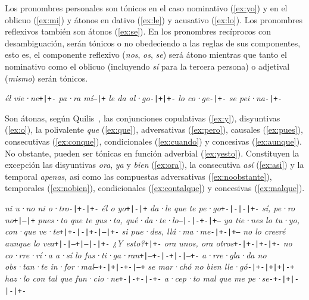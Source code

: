 Los pronombres personales son tónicos en el caso nominativo (\ref{ex:yo}) y en el oblicuo (\ref{ex:mi}) y átonos en dativo (\ref{ex:le}) y acusativo (\ref{ex:lo}). Los pronombres reflexivos también son átonos  (\ref{ex:se}). En los pronombres recíprocos con desambiguación, serán tónicos o no obedeciendo a las reglas de sus componentes, esto es, el componente reflexivo (\textit{nos}, \textit{os}, \textit{se}) será átono mientras que tanto el nominativo como el oblicuo (incluyendo \textit{sí} para la tercera persona) o adjetival (\textit{mismo}) serán tónicos.
\begin{exe}
	\ex\label{ex:yo}\textit{él vie·ne}\tab\texttt{+|+-}
	\ex\label{ex:mi}\textit{pa·ra mí}\tab\texttt{--|+}
	\ex\label{ex:le}\textit{le da al·go}\tab\texttt{-|+|+-}
	\ex\label{ex:lo}\textit{lo co·ge}\tab\texttt{-|+-}
	\ex\label{ex:se}\textit{se pei·na}\tab\texttt{-|+-}
\end{exe}

Son átonas, según Quilis~\parencite*[24]{quilis2013}, las conjunciones copulativas (\ref{ex:y}), disyuntivas (\ref{ex:o}), la polivalente \textit{que} (\ref{ex:que}), adversativas (\ref{ex:pero}), causales (\ref{ex:pues}), consecutivas (\ref{ex:conque}), condicionales (\ref{ex:cuando}) y concesivas (\ref{ex:aunque}). No obstante, pueden ser tónicas en función adverbial (\ref{ex:yesto}). Constituyen la excepción las disyuntivas \textit{ora}, \textit{ya} y \textit{bien} (\ref{ex:ora}), la consecutiva \textit{así} (\ref{ex:asi}) y la temporal \textit{apenas}, así como las compuestas adversativas (\ref{ex:noobstante}), temporales (\ref{ex:nobien}), condicionales (\ref{ex:contalque}) y concesivas  (\ref{ex:malque}).
\begin{exe}
	\ex\label{ex:y}\textit{ni u·no ni o·tro}\tab \texttt{-|+-|+-}
	\ex\label{ex:o}\textit{él o yo}\tab \texttt{+|-|+}
	\ex\label{ex:que}\textit{da·le que te pe·go}\tab \texttt{+-|-|-|+-}
	\ex\label{ex:pero}\textit{sí, pe·ro no}\tab \texttt{+|--|+}
	\ex\label{ex:pues}\textit{pues·to que te gus·ta, qué·da·te·lo}\tab \texttt{--|-|-+-|+---}
	\ex\label{ex:conque}\textit{ya tie·nes lo tu·yo, con·que ve·te}\tab \texttt{+|+-|-|+-|--|+-}
	\ex\label{ex:cuando}\textit{si pue·des, llá·ma·me}\tab \texttt{-|+-|+--}
	\ex\label{ex:aunque}\textit{no lo creeré aunque lo vea}\tab\texttt{+|-|--+|--|-|+-}
	\ex\label{ex:yesto}\textit{¿Y esto?}\tab \texttt{+|+-}
	\ex\label{ex:ora}\textit{ora unos, ora otros}\tab \texttt{+-|+-|+-|+-}
	\ex\label{ex:asi}\textit{no co·rre·rí·a a·sí lo fus·ti·ga·ran}\tab \texttt{+|--+-|-+|-|--+-}
	\ex\label{ex:noobstante}\textit{a·rre·gla·da no obs·tan·te in·for·mal}\tab \texttt{--+-|+|-+-|--+}
	\ex\label{ex:nobien}\textit{se mar·chó no bien lle·gó}\tab \texttt{-|+-|+|+|-+}
	\ex\label{ex:contalque}\textit{haz·lo con tal que fun·cio·ne}\tab\texttt{+-|-+-|-+-}
	\ex\label{ex:malque}\textit{a·cep·to mal que me pe·se}\tab\texttt{-+-|+|-|-|+-}
\end{exe}


